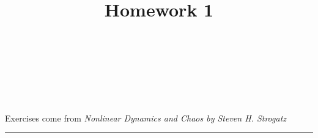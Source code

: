 \documentclass[10pt]{amsart}
\theoremstyle{nonumberplain}
\begin{document}
\pagestyle{empty}

\newcommand{\mline}{\vspace{.2in}\hrule\vspace{.2in}}

\noindent
{} \\
 \\
 \\
 \\

\title{\bf {Homework 1} }


\maketitle
\noindent
Exercises come from \textit{Nonlinear Dynamics and Chaos by Steven H. Strogatz}
\mline
\end{document}
